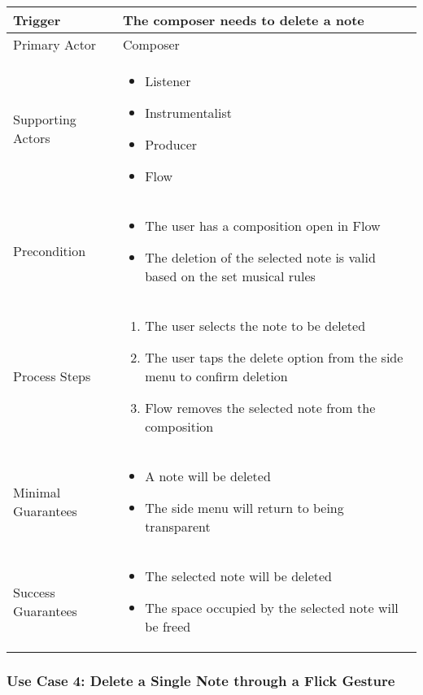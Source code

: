 \begin{tabularx}{\textwidth}{|X|X|}
\hline
Trigger & 
The composer needs to delete a note \\
\hline
Primary Actor & 
Composer\\
\hline
Supporting Actors & 
\begin{itemize}
\item Listener
\item Instrumentalist
\item Producer
\item Flow
\end{itemize} \\
\hline
Precondition & 
\begin{itemize}
\item The user has a composition open in Flow 
\item The deletion of the selected note is valid based on the set musical rules
\end{itemize} \\
\hline
Process Steps & 
\begin{enumerate}
\item The user selects the note to be deleted 
\item The user taps the delete option from the side menu to confirm deletion
\item Flow removes the selected note from the composition
\end{enumerate} \\
\hline
Minimal Guarantees & 
\begin{itemize}
  \item A note will be deleted
  \item The side menu will return to being transparent
\end{itemize} \\
\hline
Success Guarantees & 
\begin{itemize}
  \item The selected note will be deleted
  \item The space occupied by the selected note will be freed
\end{itemize} \\
\hline
\end{tabularx}

\subsubsection{Use Case 4: Delete a Single Note through a Flick Gesture}

